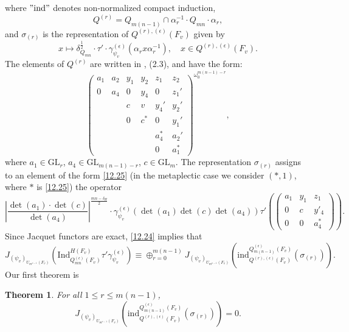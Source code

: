 \documentclass[12pts]{amsart}
\newcommand{\GL}{{\mathrm{GL}}}
\newcommand{\Ind}{{\mathrm{Ind}}}
\newcommand{\ind}{{\mathrm{ind}}}
\newtheorem{thm}{Theorem}[section]
\begin{document}
where $"\ind"$ denotes non-normalized compact induction,
$$
Q^{(r)}=Q_{m(n-1)}\cap \alpha_r^{-1}\cdot Q_{mn}\cdot \alpha_r,
$$
and
$\sigma_{(r)}$ is the representation of $Q^{(r),(\epsilon)}(F_v)$ given by
$$
x\mapsto
\delta_{Q_{mn}}^{\frac{1}{2}}\cdot\tau'\cdot \gamma^{(\epsilon)}_{\psi_v}(\alpha_rx\alpha_r^{-1}),\quad
x\in Q^{(r),(\epsilon)}(F_v).
$$
The elements of $Q^{(r)}$ are written in \cite{GS18}, (2.3), and have the form:
\begin{equation}\label{12.25}
\begin{pmatrix}
a_1&a_2&y_1&y_2&z_1&z_2\\
0&a_4&0&y_4&0&z_1'\\
&&c&v&y_4'&y_2'\\
&&0&c^*&0&y_1'\\
&&&&a_4^*&a_2'\\
&&&&0&a_1^*\end{pmatrix}^{\omega_0^{m(n-1)-r}},
\end{equation}
where $a_1\in\GL_r$, $a_4\in\GL_{m(n-1)-r}$, $c\in\GL_m$. The
representation $\sigma_{(r)}$ assigns to an element of the form
\eqref{12.25} (in the metaplectic case we consider $(\ast,1)$, where $\ast$ is \eqref{12.25}) the operator
\begin{equation}\label{12.26}
\left|\frac{\det(a_1)\cdot\det(c)}{\det(a_4)}\right|^{\frac{mn-\delta_H}{2}}\cdot\gamma^{(\epsilon)}_{\psi_v}(\det(a_1)\det(c)\det(a_4))\tau'(\begin{pmatrix}a_1&y_1&z_1\\
0&c&y'_4\\
0&0&a^*_4\end{pmatrix}).
\end{equation}
Since Jacquet functors are exact, \eqref{12.24} implies that
\begin{equation}\label{12.27}
J_{(\psi_v)_{U_{m^{n-1}}(F_v)}}(\Ind^{H(F_v)}_{Q^{(\epsilon)}_{mn}(F_v)}\tau'\gamma_{\psi_v}^{(\epsilon)})\equiv \oplus_{r=0}^{m(n-1)}J_{(\psi_v)_{U_{m^{n-1}}(F_v)}}(\ind^{Q^{(\epsilon)}_{m(n-1)}(F_v)}_{Q^{(r),(\epsilon)}(F_v)}(\sigma_{(r)})).
\end{equation}
Our first theorem is
\begin{thm}\label{thm 12.4}
For all $1\leq r\leq m(n-1)$,
$$
J_{(\psi_v)_{U_{m^{n-1}}(F_v)}}(\ind^{Q^{(\epsilon)}_{m(n-1)}(F_v)}_{Q^{(r),(\epsilon)}(F_v)}(\sigma_{(r)}))=0.
$$
\end{thm}
\end{document}
